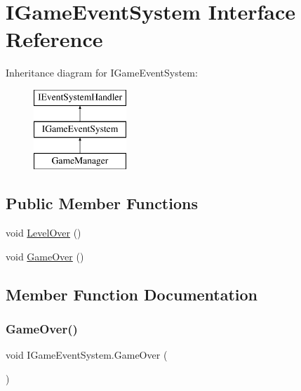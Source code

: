 \hypertarget{interface_i_game_event_system}{}\section{I\+Game\+Event\+System Interface Reference}
\label{interface_i_game_event_system}
Inheritance diagram for I\+Game\+Event\+System\+:\begin{figure}[H]
\begin{center}
\leavevmode
\includegraphics[height=3.000000cm]{interface_i_game_event_system}
\end{center}
\end{figure}
\subsection*{Public Member Functions}
\begin{DoxyCompactItemize}
\item 
void \mbox{\hyperlink{interface_i_game_event_system_a1088da77edf39eb4cbfc32a5771f1092}{Level\+Over}} ()
\item 
void \mbox{\hyperlink{interface_i_game_event_system_ab5c4b8b1d1a6fe358eb2ac3ffa93d835}{Game\+Over}} ()
\end{DoxyCompactItemize}


\subsection{Member Function Documentation}
\mbox{\label{interface_i_game_event_system_ab5c4b8b1d1a6fe358eb2ac3ffa93d835}} 
\subsubsection{\texorpdfstring{Game\+Over()}{GameOver()}}
{\footnotesize\ttfamily void I\+Game\+Event\+System.\+Game\+Over (\begin{DoxyParamCaption}{ }\end{DoxyParamCaption})}


